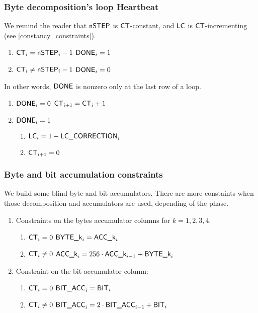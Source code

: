 \subsubsection{Byte decomposition's loop Heartbeat}
\begin{center}
\end{center}
We remind the reader that $\textsf{nSTEP}$ is $\textsf{CT}$-constant, and $\textsf{LC}$ is $\textsf{CT}$-incrementing (see \ref{constancy_constraints}).
\begin{enumerate}
    \item \If $\textsf{CT}_{i}=\textsf{nSTEP}_{i}-1$ \Then $\textsf{DONE}_{i}=1$ 
    \item \If $\textsf{CT}_{i} \neq \textsf{nSTEP}_{i}-1$ \Then $\textsf{DONE}_{i}=0$
\end{enumerate}
In other words, $\textsf{DONE}$ is nonzero only at the last row of a loop.
\begin{enumerate}[resume]
    \item \If $\textsf{DONE}_{i}=0$ \Then $\textsf{CT}_{i+1} = \textsf{CT}_{i} +1$
    \item \If $\textsf{DONE}_{i}=1$ \Then 
    \begin{enumerate}
        \item $\textsf{LC}_{i}=1-\textsf{LC\_CORRECTION}_{i}$
        \item $\textsf{CT}_{i+1} = 0$
    \end{enumerate}
\end{enumerate}

\subsubsection{Byte and bit accumulation constraints}
We build some blind byte and bit accumulators. There are more constaints when those decomposition and accumulators are used, depending of the phase. 
\begin{enumerate}
    \item Constraints on the bytes accumulator columns for $k= 1,2, 3, 4$. 
    \begin{enumerate}
        \item \If $\textsf{CT}_{i}=0$ \Then $\textsf{BYTE}\textsf{\_k}_{i} = \textsf{ACC}\textsf{\_k}_{i}$
        \item \If $\textsf{CT}_{i} \neq 0$  \Then $\textsf{ACC}\textsf{\_k}_{i}=256 \cdot \textsf{ACC}\textsf{\_k}_{i-1} + \textsf{BYTE}\textsf{\_k}_{i}$
    \end{enumerate}
    \item Constraint on the bit accumulator column:
    \begin{enumerate}
        \item \If $\textsf{CT}_{i}=0$ \Then $\textsf{BIT\_ACC}_{i} = \textsf{BIT}_{i}$
        \item \If $\textsf{CT}_{i} \neq 0$  \Then $\textsf{BIT\_ACC}_{i}=2 \cdot \textsf{BIT\_ACC}_{i-1} + \textsf{BIT}_{i}$
    \end{enumerate}
\end{enumerate}

